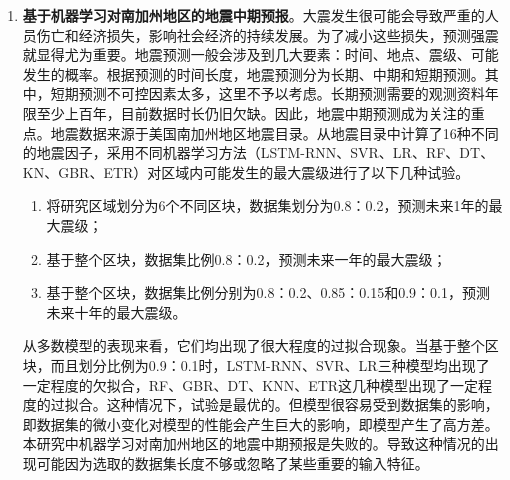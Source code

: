 \begin{enumerate}
    \item \textbf{基于机器学习对南加州地区的地震中期预报}。大震发生很可能会导致严重的人员伤亡和经济损失，影响社会经济的持续发展。为了减小这些损失，预测强震就显得尤为重要。地震预测一般会涉及到几大要素：时间、地点、震级、可能发生的概率。根据预测的时间长度，地震预测分为长期、中期和短期预测。其中，短期预测不可控因素太多，这里不予以考虑。长期预测需要的观测资料年限至少上百年，目前数据时长仍旧欠缺。因此，地震中期预测成为关注的重点。地震数据来源于美国南加州地区地震目录。从地震目录中计算了16种不同的地震因子，采用不同机器学习方法（LSTM-RNN、SVR、LR、RF、DT、KN、GBR、ETR）对区域内可能发生的最大震级进行了以下几种试验。
    \begin{enumerate}
      \item 将研究区域划分为6个不同区块，数据集划分为0.8：0.2，预测未来1年的最大震级；
      \item 基于整个区块，数据集比例0.8：0.2，预测未来一年的最大震级；
      \item 基于整个区块，数据集比例分别为0.8：0.2、0.85：0.15和0.9：0.1，预测未来十年的最大震级。
    \end{enumerate}
    
    从多数模型的表现来看，它们均出现了很大程度的过拟合现象。当基于整个区块，而且划分比例为0.9：0.1时，LSTM-RNN、SVR、LR三种模型均出现了一定程度的欠拟合，RF、GBR、DT、KNN、ETR这几种模型出现了一定程度的过拟合。这种情况下，试验是最优的。但模型很容易受到数据集的影响，即数据集的微小变化对模型的性能会产生巨大的影响，即模型产生了高方差。本研究中机器学习对南加州地区的地震中期预报是失败的。导致这种情况的出现可能因为选取的数据集长度不够或忽略了某些重要的输入特征。

\end{enumerate}